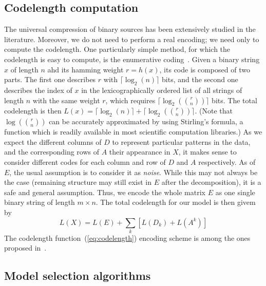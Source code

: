 \documentclass[twocolumn]{IEEEtran}
\theoremstyle{definition}
\newcommand{\refeq}[1]{(\ref{#1})}
\begin{document}
\subsection{Codelength computation}

The universal compression of binary sources has been extensively studied in the literature. Moreover, we do not need to perform a real encoding; we need only to compute the codelength. One particularly simple method, for which the codelength is easy to compute, is the enumerative coding~\cite{enum}. Given a binary string $x$ of length $n$ ahd its hamming weight $r=h(x)$, its code is composed of two parts. The first one describes $r$ with $\lceil\log_2(n)\rceil$ bits, and the second one describes the index of $x$ in the lexicographically ordered list of all strings of length $n$ with the same weight $r$, which requires $\lceil\log_2(r \choose n)\rceil$ bits. The total codelength is then $L(x) = \lceil\log_2(n)\rceil + \lceil\log_2(r \choose n)\rceil$. (Note that $\log(r \choose n)$ can be accurately approximated by using Stirling's formula, a function which is readily available in most scientific computation libraries.)
As we expect the different columns of $D$ to represent particular patterns in the data, and the corresponding rows of $A$ their appearance in $X$, it makes sense to consider different codes for each column and row of $D$ and $A$ respectively. As of $E$, the usual assumption is to consider it as \emph{noise}. While this may not always be the case (remaining structure may still exist in $E$ after the decomposition), it is a safe and general assumption. Thus, we encode the whole matrix $E$ as one single binary string of length $m{\times}n$. The total codelength for our model is then givem by
\begin{equation}
L(X) = L(E) + \sum_k [ L(D_k) + L(A^k) ] 
\label{eq:codelength}
\end{equation} 
The codelength function~\refeq{eq:codelength} encoding scheme is among the ones proposed in~\cite{bmf-mdl}.

\subsection{Model selection algorithms}
\end{document}
